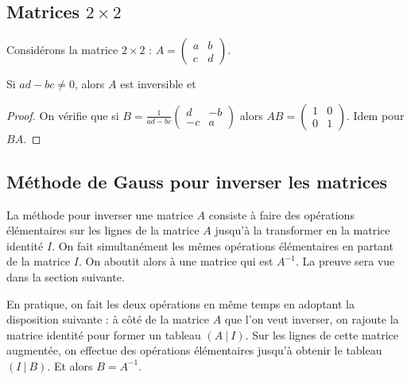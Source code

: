 \documentclass[class=report,crop=false]{standalone}
\begin{document}
\subsection{Matrices $2 \times 2$}
 Considérons la matrice $2\times 2$ :
$A = \begin{pmatrix}
 a & b\\
 c & d
     \end{pmatrix}.
$
\begin{proposition}

Si $ad - bc \not= 0$,  alors $A$ est inversible et
\end{proposition}


\begin{proof}
On vérifie que si $B=\frac{1}{ad-bc}  \left(\begin{smallmatrix}
d & -b\\
 -c & a
\end{smallmatrix}\right)$ alors $AB = \left(\begin{smallmatrix}
 1 & 0\\
 0 & 1
 \end{smallmatrix}\right)$. Idem pour $BA$.
\end{proof}


\subsection{Méthode de Gauss pour inverser les matrices}

La méthode pour inverser une matrice $A$
consiste à faire des opérations élémentaires sur les lignes de la matrice $A$
jusqu'à la transformer en la matrice identité $I$.
On fait simultanément les mêmes opérations élémentaires en partant de la matrice $I$.
On aboutit alors à une matrice qui est $A^{-1}$. La preuve sera vue dans la section suivante.

\bigskip

En pratique, on fait les deux opérations en même temps en adoptant la disposition suivante :
à côté de la matrice $A$ que l'on veut inverser, on rajoute la matrice identité
pour former un tableau $(A\ |\ I)$.
Sur les lignes de cette matrice augmentée, on effectue des opérations
élémentaires jusqu'à obtenir
le tableau $(I\ |\ B)$. Et alors $B=A^{-1}$.
\end{document}
